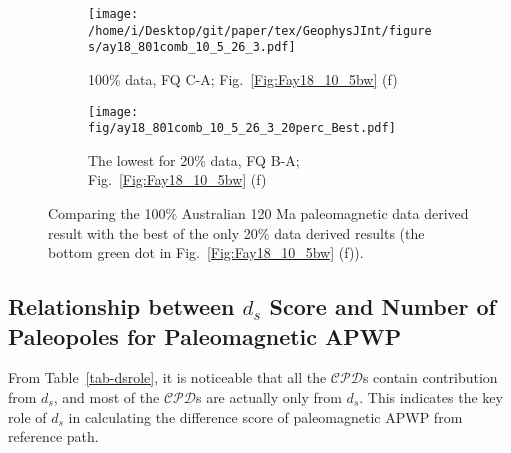 \begin{figure*}[tbp]
  \captionsetup[subfigure]{labelformat=empty,aboveskip=-6pt,belowskip=-6pt}
  \centering
  \begin{subfigure}[htbp]{.49\textwidth}
    \captionsetup{skip=0pt}
    \centering
    \texttt{[image: /home/i/Desktop/git/paper/tex/GeophysJInt/figures/ay18\_801comb\_10\_5\_26\_3.pdf]}
    \caption{100\% data, FQ C-A; Fig.~\ref{Fig:Fay18_10_5bw}
    (f)}\label{Fig:Fay18_10_5w801}
  \end{subfigure}
  \begin{subfigure}[htbp]{.49\textwidth}
    \captionsetup{skip=0pt}
    \centering
    \texttt{[image: fig/ay18\_801comb\_10\_5\_26\_3\_20perc\_Best.pdf]} %
    \caption{The lowest for 20\% data, FQ B-A; Fig.~\ref{Fig:Fay18_10_5bw}
    (f)}\label{Fig:Fay18_10_5w801l20p}
  \end{subfigure}
  \caption[Less data, better similarity?]{Comparing the 100\% Australian
  120 Ma paleomagnetic data derived result with the best of the only
  20\% data derived results (the bottom green dot in Fig.~\ref{Fig:Fay18_10_5bw}
  (f)).}\label{Fig:Fay18_10_5w801l20p_vs_100p}
\end{figure*}

\subsection{Relationship between $d_s$ Score and Number of Paleopoles for
Paleomagnetic APWP}

From Table~\ref{tab-dsrole}, it is noticeable that all the $\mathcal{CPD}$s
contain contribution from $d_s$, and most of the $\mathcal{CPD}$s are actually
only from $d_s$. This indicates the key role of $d_s$ in calculating the
difference score of paleomagnetic APWP from reference path.

